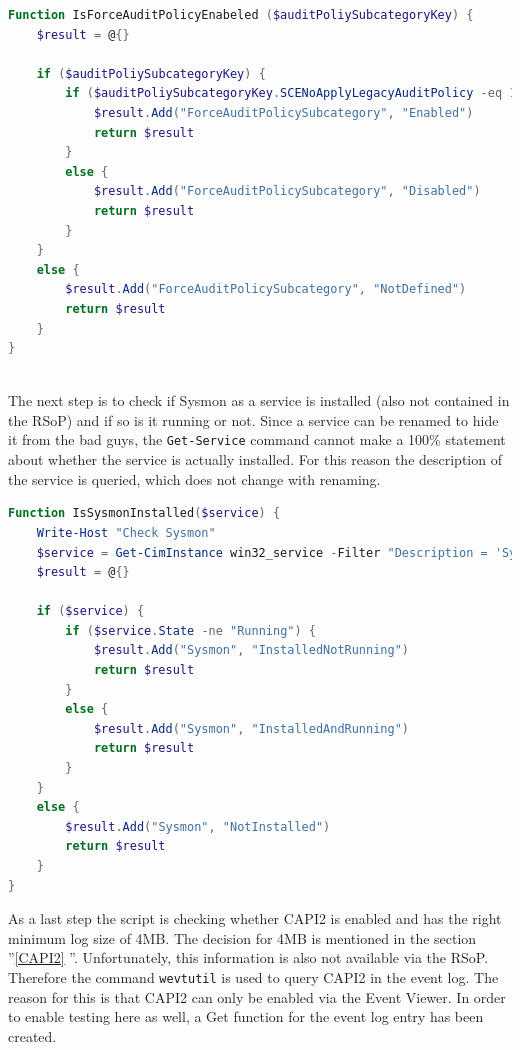 \begin{lstlisting}[caption=Function IsForceAuditPolicyEnabeled, language=PowerShell]
Function IsForceAuditPolicyEnabeled ($auditPoliySubcategoryKey) {
    $result = @{}

    if ($auditPoliySubcategoryKey) {
        if ($auditPoliySubcategoryKey.SCENoApplyLegacyAuditPolicy -eq 1) {
            $result.Add("ForceAuditPolicySubcategory", "Enabled")
            return $result
        }
        else {
            $result.Add("ForceAuditPolicySubcategory", "Disabled")
            return $result
        }
    }
    else {
        $result.Add("ForceAuditPolicySubcategory", "NotDefined")
        return $result
    }
}
\end{lstlisting}\ \\
The next step is to check if Sysmon as a service is installed (also not contained in the RSoP) and if so is it running or not. Since a service can be renamed to hide it from the bad guys, the \lstinline|Get-Service| command cannot make a 100\% statement about whether the service is actually installed. For this reason the description of the service is queried, which does not change with renaming. \cite{Sysmon1}
\begin{lstlisting}[caption=Function IsSysmonInstalled, language=PowerShell]
Function IsSysmonInstalled($service) {
    Write-Host "Check Sysmon"
    $service = Get-CimInstance win32_service -Filter "Description = 'System Monitor service'"
    $result = @{}

    if ($service) {
        if ($service.State -ne "Running") {
            $result.Add("Sysmon", "InstalledNotRunning")
            return $result
        }
        else {
            $result.Add("Sysmon", "InstalledAndRunning")
            return $result
        }
    }
    else {
        $result.Add("Sysmon", "NotInstalled")
        return $result
    }
}
\end{lstlisting}

\clearpage

As a last step the script is checking whether CAPI2 is enabled and has the right minimum log size of 4MB. The decision for 4MB is mentioned in the section ''\ref{CAPI2} ''. Unfortunately, this information is also not available via the RSoP. Therefore the command \lstinline|wevtutil| is used to query CAPI2 in the event log. The reason for this is that CAPI2 can only be enabled via the Event Viewer. \cite{CAPI2} In order to enable testing here as well, a Get function for the event log entry has been created.

